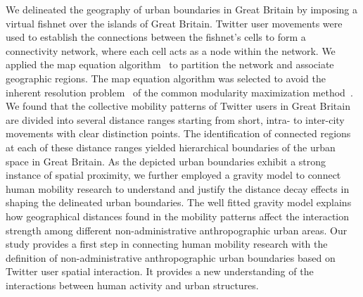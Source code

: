 \documentclass[]{tGIS2e}
\begin{document}
We delineated the geography of urban boundaries in Great Britain by imposing a virtual fishnet over the islands of Great Britain.
Twitter user movements were used to establish the connections between the fishnet's cells to form a connectivity network, where each cell acts as a node within the network.
We applied the map equation algorithm~\citep{domenico2015} to partition the network and associate geographic regions.
The map equation algorithm was selected to avoid the inherent resolution problem~\citep{fortunato2007} of the common modularity maximization method~\citep{newman2006}. 
We found that the collective mobility patterns of Twitter users in Great Britain are divided into several distance ranges starting from short, intra- to inter-city movements with clear distinction points. 
The identification of connected regions at each of these distance ranges yielded hierarchical boundaries of the urban space in Great Britain.
As the depicted urban boundaries exhibit a strong instance of spatial proximity, we further employed a gravity model to connect human mobility research to understand and justify the distance decay effects in shaping the delineated urban boundaries.
The well fitted gravity model explains how geographical distances found in the mobility patterns affect the interaction strength among different non-administrative anthropographic urban areas. 
Our study provides a first step in connecting human mobility research with the definition of non-administrative anthropographic urban boundaries based on Twitter user spatial interaction. 
It provides a new understanding of the interactions between human activity and urban structures. 
\end{document}
